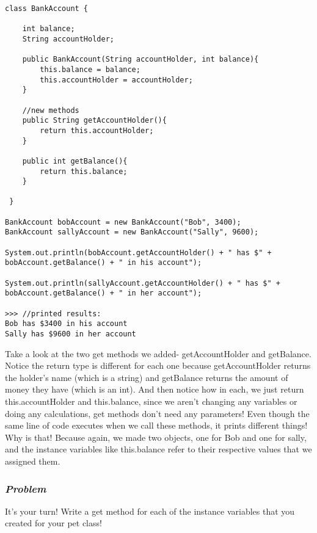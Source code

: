 \documentclass[14pt]{extreport}%
\begin{document}
\begin{lstlisting}
class BankAccount {
      
    int balance;
    String accountHolder;

    public BankAccount(String accountHolder, int balance){
        this.balance = balance;
        this.accountHolder = accountHolder;
    }

    //new methods 
    public String getAccountHolder(){
        return this.accountHolder;
    }

    public int getBalance(){
        return this.balance;
    }

 }
 
BankAccount bobAccount = new BankAccount("Bob", 3400);
BankAccount sallyAccount = new BankAccount("Sally", 9600);

System.out.println(bobAccount.getAccountHolder() + " has $" + bobAccount.getBalance() + " in his account");

System.out.println(sallyAccount.getAccountHolder() + " has $" + bobAccount.getBalance() + " in her account");

>>> //printed results:
Bob has $3400 in his account
Sally has $9600 in her account
\end{lstlisting}{}

Take a look at the two get methods we added- getAccountHolder and getBalance. Notice the return type is different for each one because getAccountHolder returns the holder's name (which is a string) and getBalance returns the amount of money they have (which is an int). And then notice how in each, we just return this.accountHolder and this.balance, since we aren't changing any variables or doing any calculations, get methods don't need any parameters! Even though the same line of code executes when we call these methods, it prints different things! Why is that! Because again, we made two objects, one for Bob and one for sally, and the instance variables like this.balance refer to their respective values that we assigned them.

\subsubsection{\textit{Problem}}
It's your turn! Write a get method for each of the instance variables that you created for your pet class! 
\end{document}
